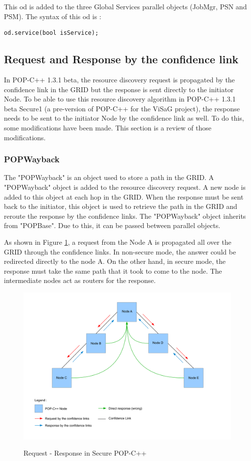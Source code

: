 This od is added to the three Global Services parallel objects (JobMgr, PSN and PSM). The syntax of this od is : 
\begin{lstlisting}
od.service(bool isService);
\end{lstlisting}


\pagebreak
\subsection{Request and Response by the confidence link}
In POP-C++ 1.3.1 beta, the resource discovery request is propagated by the confidence link in the GRID but the response is sent directly to the initiator Node. To be able to use this resource discovery algorithm in POP-C++ 1.3.1 beta Secure1 (a pre-version of POP-C++ for the ViSaG project), the response needs to be sent to the initiator Node by the confidence link as well. To do this, some modifications have been made. This section is a review of those modifications.

\subsubsection{POPWayback}
\label{lb:popwayback}
The "POPWayback" is an object used to store a path in the GRID. A "POPWayback" object is added to the resource discovery request. A new node is added to this object at each hop in the GRID. When the response must be sent back to the initiator, this object is used to retrieve the path in the GRID and reroute the response by the confidence links. The "POPWayback" object inherits from "POPBase". Due to this, it can be passed between parallel objects.

As shown in Figure \ref{fig:wayback}, a request from the Node A is propagated all over the GRID through the confidence links. In non-secure mode, the answer could be redirected directly to the node A. On the other hand, in secure mode, the response must take the same path that it took to come to the node. The intermediate nodes act as routers for the response.

\begin{figure}[ht]
	\caption{Request - Response in Secure POP-C++}
  	\centering
	\includegraphics[width=1.0\textwidth]{../wayback.pdf}
	\label{fig:wayback}
\end{figure}

